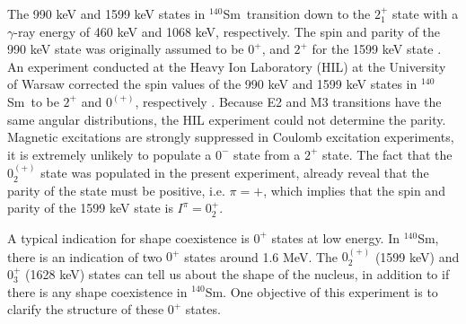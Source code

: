 \documentclass[twoside,english]{uiofysmaster/uiofysmaster}
\newcommand{\Sm}{$^{140}$Sm} %
\newcommand{\ga}{$\gamma$}
\begin{document}
The 990 keV and 1599 keV states in \Sm\ transition down to the $2_1^+$ state with a \ga-ray energy of 460 keV  and 1068 keV, respectively.
The spin and parity of the 990 keV state was originally assumed to be $0^+$, and $2^+$ for the 1599 keV state  \cite{Firestone}.
An experiment conducted at the Heavy Ion Laboratory (HIL) at the University of Warsaw corrected the spin values of the 990 keV and 1599 keV states in \Sm\ to be $2^+$ and $0^{(+)}$, respectively \cite{Klintefjord2015, Samorajczyk2015}.
Because E2 and M3 transitions have the same angular distributions, the HIL experiment could not determine the parity. 
Magnetic excitations are strongly suppressed in Coulomb excitation experiments, it is extremely unlikely to populate a $0^-$ state from a $2^+$ state.
The fact that the $0_2^{(+)}$ state was populated in the present experiment, already reveal that the parity of the state must be positive, i.e. $\pi = +$, which implies that the spin and parity of the 1599 keV state is $I^\pi = 0_2^+$. 

A typical indication for shape coexistence is $0^+$ states at low energy. 
In \Sm, there is an indication of two $0^+$ states around 1.6 MeV.
The $0_2^{(+)}$ (1599 keV) and $0_3^{+}$ (1628 keV) states can tell us about the shape of the nucleus, in addition to if there is any shape coexistence in \Sm.  
One objective of this experiment is to clarify the structure of these $0^+$ states. 
\end{document}
